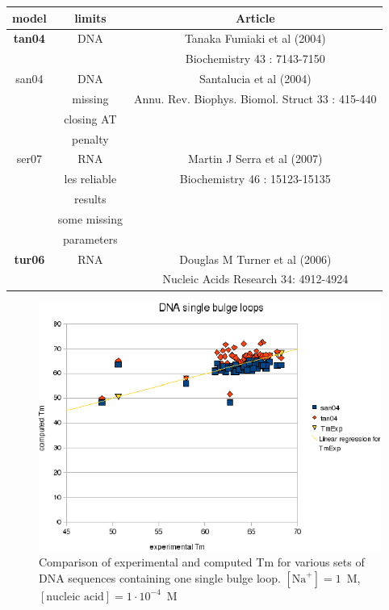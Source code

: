 \documentclass{article}
\begin{document}
\begin{table}[hc]
\begin{tabular}[h]{| c | c | c |}
\textbf{model} & \textbf{limits} & \textbf{Article} \\
\hline
\textbf{tan04} & DNA & Tanaka Fumiaki et al (2004)\\
 & & Biochemistry 43 : 7143-7150 \\
\hline
san04 & DNA & Santalucia et al (2004)\\
 & missing & Annu. Rev. Biophys. Biomol. Struct 33 : 415-440\\
 & closing AT & \\
 & penalty & \\
 \hline
ser07 & RNA & Martin J Serra et al (2007)\\
 & les reliable & Biochemistry 46 : 15123-15135 \\
 & results & \\
 & some missing & \\
 & parameters & \\
 \hline
\textbf{tur06} & RNA & Douglas M Turner et al (2006)\\
 & & Nucleic Acids Research 34: 4912-4924 \\
\hline
\end{tabular}
\end{table}

\begin{figure}[h]
\includegraphics[width=1\linewidth]{images/DNASingleBulgeLoop}
\caption{Comparison of experimental and computed Tm for various sets of DNA sequences containing one single bulge loop. $[\mbox{Na}^+] = 1$~M, $[\mbox{nucleic acid}] = 1\cdot{}10^{-4}$~M}
\end{figure}
\end{document}
